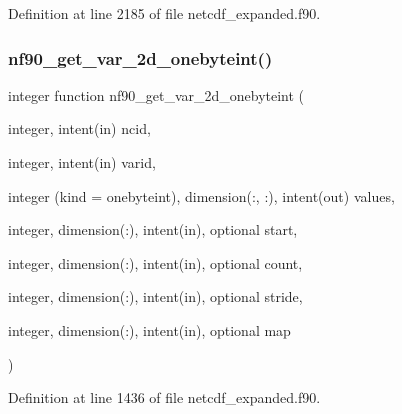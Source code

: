 Definition at line 2185 of file netcdf\+\_\+expanded.\+f90.

\mbox{\label{netcdf__expanded_8f90_a7dfc2a9b614f061eafd625723027102c}} 
\subsubsection{\texorpdfstring{nf90\+\_\+get\+\_\+var\+\_\+2d\+\_\+onebyteint()}{nf90\_get\_var\_2d\_onebyteint()}}
{\footnotesize\ttfamily integer function nf90\+\_\+get\+\_\+var\+\_\+2d\+\_\+onebyteint (\begin{DoxyParamCaption}\item[{integer, intent(in)}]{ncid,  }\item[{integer, intent(in)}]{varid,  }\item[{integer (kind = onebyteint), dimension(\+:, \+:), intent(out)}]{values,  }\item[{integer, dimension(\+:), intent(in), optional}]{start,  }\item[{integer, dimension(\+:), intent(in), optional}]{count,  }\item[{integer, dimension(\+:), intent(in), optional}]{stride,  }\item[{integer, dimension(\+:), intent(in), optional}]{map }\end{DoxyParamCaption})}



Definition at line 1436 of file netcdf\+\_\+expanded.\+f90.

\mbox{\label{netcdf__expanded_8f90_a942406e8427bff806d085216ef816794}} 

